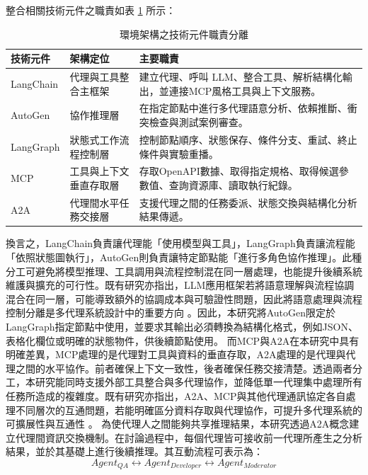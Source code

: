 \begin{ZhChapter}
\text 整合相關技術元件之職責如表 \ref{tab:environment_soc} 所示：
\clearpage
\clearpage
\begin{table}[H]
    \centering
    \caption{環境架構之技術元件職責分離}
    \label{tab:environment_soc}
    \scriptsize
    \renewcommand{\arraystretch}{1.4}
    \begin{tabular}{p{3cm} p{4cm} p{7.5cm}}
        \toprule
        \textbf{技術元件} & \textbf{架構定位} & \textbf{主要職責} \\
        \midrule
        LangChain & 代理與工具整合主框架 & 建立代理、呼叫 LLM、整合工具、解析結構化輸出，並連接MCP風格工具與上下文服務。 \\
        AutoGen & 協作推理層 & 在指定節點中進行多代理語意分析、依賴推斷、衝突檢查與測試案例審查。 \\
        LangGraph & 狀態式工作流程控制層 & 控制節點順序、狀態保存、條件分支、重試、終止條件與實驗重播。 \\
        MCP & 工具與上下文垂直存取層 & 存取OpenAPI數據、取得指定規格、取得候選參數值、查詢資源庫、讀取執行紀錄。 \\
        A2A & 代理間水平任務交接層 & 支援代理之間的任務委派、狀態交換與結構化分析結果傳遞。 \\
        \bottomrule
    \end{tabular}
\end{table}

\text 換言之，LangChain負責讓代理能「使用模型與工具」，LangGraph負責讓流程能「依照狀態圖執行」，AutoGen則負責讓特定節點能「進行多角色協作推理」。此種分工可避免將模型推理、工具調用與流程控制混在同一層處理，也能提升後續系統維護與擴充的可行性。既有研究亦指出，LLM應用框架若將語意理解與流程協調混合在同一層，可能導致額外的協調成本與可驗證性問題，因此將語意處理與流程控制分離是多代理系統設計中的重要方向 \parencite{Borghoff2025Beyond, Bandi2025Rise}。因此，本研究將AutoGen限定於LangGraph指定節點中使用，並要求其輸出必須轉換為結構化格式，例如JSON、表格化欄位或明確的狀態物件，供後續節點使用。
\text 而MCP與A2A在本研究中具有明確差異，MCP處理的是代理對工具與資料的垂直存取，A2A處理的是代理與代理之間的水平協作。前者確保上下文一致性，後者確保任務交接清楚。透過兩者分工，本研究能同時支援外部工具整合與多代理協作，並降低單一代理集中處理所有任務所造成的複雜度。既有研究亦指出，A2A、MCP與其他代理通訊協定各自處理不同層次的互通問題，若能明確區分資料存取與代理協作，可提升多代理系統的可擴展性與互通性 \parencite{Ehtesham2025SurveyMCPACPA2AANP, Tupe2024MultiAgentCollaboration, Wang2025Survey, Du2026TaskON}。
\text 為使代理人之間能夠共享推理結果，本研究透過A2A概念建立代理間資訊交換機制。在討論過程中，每個代理皆可接收前一代理所產生之分析結果，並於其基礎上進行後續推理。其互動流程可表示為：
\begin{equation}
Agent_{QA}
\leftrightarrow
Agent_{Developer}
\leftrightarrow
Agent_{Moderator}
\end{equation}


\end{ZhChapter}
